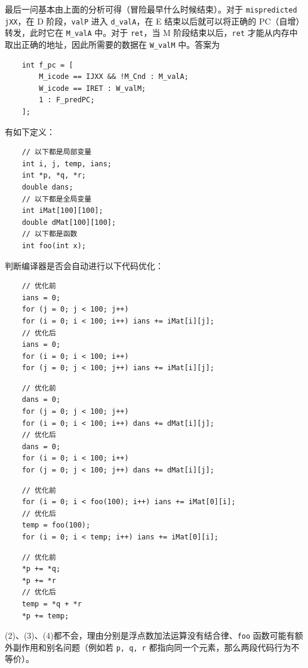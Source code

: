 \begin{problems}
        最后一问基本由上面的分析可得（冒险最早什么时候结束）。对于 \verb|mispredicted jXX|，在 D 阶段，\verb|valP| 进入 \verb|d_valA|，在 E 结束以后就可以将正确的 PC（自增）转发，此时它在 \verb|M_valA| 中。对于 \verb|ret|，当 M 阶段结束以后，\verb|ret| 才能从内存中取出正确的地址，因此所需要的数据在 \verb|W_valM| 中。答案为
        \begin{verbatim}
    int f_pc = [
        M_icode == IJXX && !M_Cnd : M_valA;
        W_icode == IRET : W_valM;
        1 : F_predPC;
    ];
        \end{verbatim}
        \pro 有如下定义：
        \begin{verbatim}
    // 以下都是局部变量
    int i, j, temp, ians;
    int *p, *q, *r;
    double dans;
    // 以下都是全局变量
    int iMat[100][100];
    double dMat[100][100];
    // 以下都是函数
    int foo(int x);
        \end{verbatim}
        判断编译器是否会自动进行以下代码优化：
        \qn
        \begin{verbatim}
    // 优化前
    ians = 0;
    for (j = 0; j < 100; j++)
    for (i = 0; i < 100; i++) ians += iMat[i][j];
    // 优化后
    ians = 0;
    for (i = 0; i < 100; i++)
    for (j = 0; j < 100; j++) ians += iMat[i][j];
        \end{verbatim}
        \qn
        \begin{verbatim}
    // 优化前
    dans = 0;
    for (j = 0; j < 100; j++)
    for (i = 0; i < 100; i++) dans += dMat[i][j];
    // 优化后
    dans = 0;
    for (i = 0; i < 100; i++)
    for (j = 0; j < 100; j++) dans += dMat[i][j];
        \end{verbatim}
        \qn
        \begin{verbatim}
    // 优化前
    for (i = 0; i < foo(100); i++) ians += iMat[0][i];
    // 优化后
    temp = foo(100);
    for (i = 0; i < temp; i++) ians += iMat[0][i];
        \end{verbatim}
        \qn
        \begin{verbatim}
    // 优化前
    *p += *q;
    *p += *r
    // 优化后
    temp = *q + *r
    *p += temp;
        \end{verbatim}
        \sol (2)、(3)、(4)都不会，理由分别是浮点数加法运算没有结合律、\verb|foo| 函数可能有额外副作用和别名问题（例如若 \verb|p, q, r| 都指向同一个元素，那么两段代码行为不等价）。

\end{problems}
